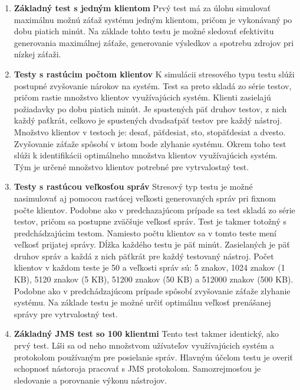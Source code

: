 \documentclass[12pt,oneside,final]{fithesis-utf8}
\begin{document}
\begin{enumerate}

\item \textbf{Základný test s jedným klientom}
\newline
Prvý test má za úlohu simulovať maximálnu možnú záťaž systému jedným klientom, pričom je vykonávaný po dobu piatich minút. Na základe tohto testu je možné sledovať efektivitu generovania maximálnej záťaže, generovanie výsledkov a spotrebu zdrojov pri nízkej záťaži.
\newline

\item \textbf{Testy s rastúcim počtom klientov}
\newline
K simulácii stresového typu testu slúži postupné zvyšovanie nárokov na systém. Test sa preto skladá zo série testov, pričom rastie množstvo klientov využívajúcich systém. Klienti zasielajú požiadavky po dobu piatich minút. Je spustených päť druhov testov, z nich každý paťkrát, celkovo je spustených dvadsaťpäť testov pre každý nástroj. Množstvo klientov v testoch je: desať, päťdesiat, sto, stopäťdesiat a dvesto. Zvyšovanie záťaže spôsobí v istom bode zlyhanie systému. Okrem toho test slúži k identifikácii optimálneho množstva klientov využívajúcich systém. Tým je určené množstvo klientov potrebné pre vytrvalostný test.
\newline

\item \textbf{Testy s rastúcou veľkosťou správ}
\newline
Stresový typ testu je možné nasimulovať aj pomocou rastúcej veľkosti generovaných správ pri fixnom počte klientov. Podobne ako v predchazajúcom prípade sa test skladá zo série testov, pričom sa postupne zväčšuje veľkosť správ. Test je takmer totožný s predchádzajúcim testom. Namiesto počtu klientov sa v tomto teste mení veľkosť prijatej správy. Dĺžka každého testu je päť minút. Zasielaných je päť druhov správ a každá z nich päťkrát pre každý testovaný nástroj. Počet klientov v každom teste je 50 a veľkosti  správ sú: 5 znakov, 1024 znakov (1 KB), 5120 znakov (5 KB), 51200 znakov (50 KB) a 512000 znakov (500 KB). Podobne ako v predchádzajúcom prípade spôsobí zvyšovanie záťaže zlyhanie systému. Na základe testu je možné určiť optimálnu veľkosť prenášanej správy pre vytrvalostný test.
\newline

\newpage
\item \textbf{Základný JMS test so 100 klientmi}
\newline
Tento test takmer identický, ako prvý test. Líši sa od neho množstvom užívateľov využívajúcich systém a protokolom používaným pre posielanie správ. Hlavným účelom testu je overiť schopnosť nástoroja pracovať s JMS protokolom. Samozrejmosťou je sledovanie a porovnanie výkonu nástrojov.
\newline


\end{enumerate}
\end{document}
